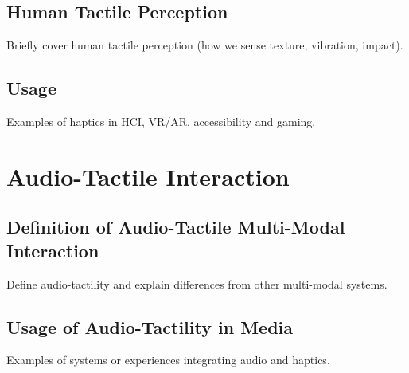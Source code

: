             \subsection{Human Tactile Perception} Briefly cover human tactile perception (how we sense texture, vibration, impact).
        \subsection{Usage} Examples of haptics in HCI, VR/AR, accessibility and gaming.
    \section{Audio-Tactile Interaction}
        \subsection{Definition of Audio-Tactile Multi-Modal Interaction} Define audio-tactility and explain differences from other multi-modal systems.
        \subsection{Usage of Audio-Tactility in Media} Examples of systems or experiences integrating audio and haptics.